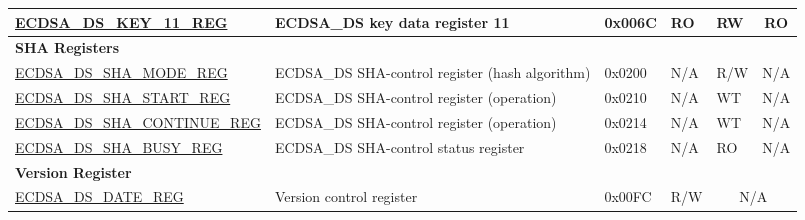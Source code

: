 \begin{small}
\begin{longtable}{ | p{4.8cm} | l | p{1.2cm} | l | l | l | l | }
\hyperref[regdesc:ECDSADSKEY11REG]{ECDSA\_DS\_KEY\_11\_REG} & ECDSA\_DS key data register 11 & 0x006C & RO & RW &\multicolumn{2}{|c|}{RO}  \\ \hline
\multicolumn{7}{|l|}{\textbf{SHA Registers}} \\ \hline
\hyperref[regdesc:ECDSADSSHAMODEREG]{ECDSA\_DS\_SHA\_MODE\_REG} & ECDSA\_DS SHA-control register (hash algorithm) & 0x0200 & N/A & R/W & \multicolumn{2}{|c|}{N/A} \\ \hline
\hyperref[regdesc:ECDSADSSHASTARTREG]{ECDSA\_DS\_SHA\_START\_REG} & ECDSA\_DS SHA-control register (operation) & 0x0210 & N/A & WT & \multicolumn{2}{|c|}{N/A} \\ \hline
\hyperref[regdesc:ECDSADSSHACONTINUEREG]{ECDSA\_DS\_SHA\_CONTINUE\_REG} & ECDSA\_DS SHA-control register (operation) & 0x0214 & N/A & WT & \multicolumn{2}{|c|}{N/A} \\ \hline
\hyperref[regdesc:ECDSADSSHABUSYREG]{ECDSA\_DS\_SHA\_BUSY\_REG} & ECDSA\_DS SHA-control status register & 0x0218 & N/A & RO & \multicolumn{2}{|c|}{N/A} \\ \hline
\multicolumn{7}{|l|}{\textbf{Version Register}} \\ \hline
\hyperref[regdesc:ECDSADSDATEREG]{ECDSA\_DS\_DATE\_REG} & Version control register & 0x00FC & R/W & \multicolumn{3}{|c|}{N/A} \\ \hline
\end{longtable}
\end{small}